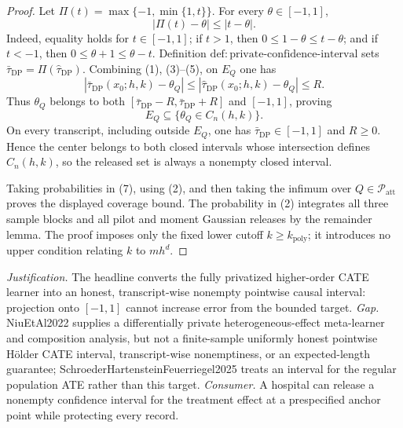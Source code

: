 \documentclass{article}
\begin{document}
\begin{proof}
Let \(\Pi(t)=\max\{-1,\min\{1,t\}\}\).  For every \(\theta\in[-1,1]\),
\[
 |\Pi(t)-\theta|\le|t-\theta|.
\tag{5}
\]
Indeed, equality holds for \(t\in[-1,1]\); if \(t>1\), then \(0\le1-\theta\le t-\theta\); and if \(t<-1\), then \(0\le\theta+1\le\theta-t\).  Definition \(\mathrm{def{:}private\text{-}confidence\text{-}interval}\) sets \(\bar\tau_{\mathrm{DP}}=\Pi(\widehat\tau_{\mathrm{DP}})\).  Combining (1), (3)--(5), on \(E_Q\) one has
\[
 |\bar\tau_{\mathrm{DP}}(x_0;h,k)-\theta_Q|
 \le|\widehat\tau_{\mathrm{DP}}(x_0;h,k)-\theta_Q|
 \le R.
\tag{6}
\]
Thus \(\theta_Q\) belongs to both \([\bar\tau_{\mathrm{DP}}-R,\bar\tau_{\mathrm{DP}}+R]\) and \([-1,1]\), proving
\[
 E_Q\subseteq\{\theta_Q\in C_n(h,k)\}.
\tag{7}
\]
On every transcript, including outside \(E_Q\), one has \(\bar\tau_{\mathrm{DP}}\in[-1,1]\) and \(R\ge0\).  Hence the center belongs to both closed intervals whose intersection defines \(C_n(h,k)\), so the released set is always a nonempty closed interval.

Taking probabilities in (7), using (2), and then taking the infimum over \(Q\in\mathcal P_{\mathrm{att}}\) proves the displayed coverage bound.  The probability in (2) integrates all three sample blocks and all pilot and moment Gaussian releases by the remainder lemma.  The proof imposes only the fixed lower cutoff \(k\ge k_{\mathrm{poly}}\); it introduces no upper condition relating \(k\) to \(mh^d\).
\end{proof}
\par\smallskip\noindent \textit{Justification.} The headline converts the fully privatized higher-order CATE learner into an honest, transcript-wise nonempty pointwise causal interval: projection onto \([-1,1]\) cannot increase error from the bounded target. \textit{Gap.} NiuEtAl2022 supplies a differentially private heterogeneous-effect meta-learner and composition analysis, but not a finite-sample uniformly honest pointwise H\"older CATE interval, transcript-wise nonemptiness, or an expected-length guarantee; SchroederHartensteinFeuerriegel2025 treats an interval for the regular population ATE rather than this target. \textit{Consumer.} A hospital can release a nonempty confidence interval for the treatment effect at a prespecified anchor point while protecting every record.
\end{document}
